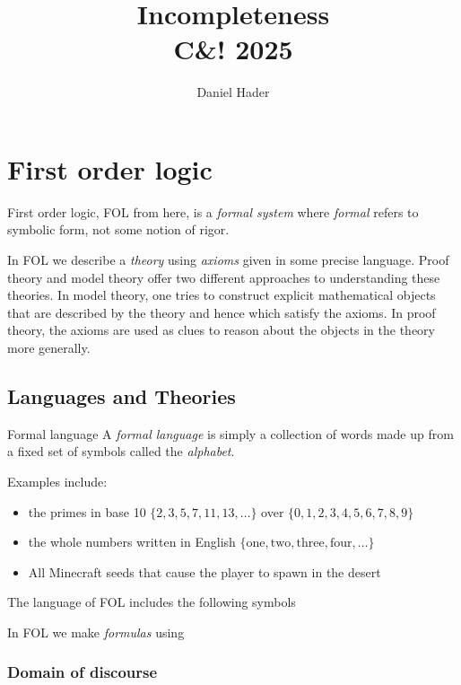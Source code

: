 \documentclass[12pt]{article}
\title{Incompleteness\\\large C\&! 2025}
\author{Daniel Hader}
\date{}
\begin{document}
	\maketitle
	
	\section{First order logic}
	
	
	First order logic, FOL from here, is a \emph{formal system} where \emph{formal} refers to symbolic form, not some notion of rigor.
	
	In FOL we describe a \emph{theory} using \emph{axioms} given in some precise language. Proof theory and model theory offer two different approaches to understanding these theories. In model theory, one tries to construct explicit mathematical objects that are described by the theory and hence which satisfy the axioms. In proof theory, the axioms are used as clues to reason about the objects in the theory more generally. 
	
	\subsection{Languages and Theories}
	
	\begin{definition}{Formal language}
		A \emph{formal language} is simply a collection of words made up from a fixed set of symbols called the \emph{alphabet}. 
	\end{definition}
	
	\noindent Examples include:
	\begin{itemize}[itemsep=0pt]
		\item the primes in base 10 $\{2, 3, 5, 7, 11, 13, \ldots \}$ over $\{0,1,2,3,4,5,6,7,8,9\}$
		\item the whole numbers written in English $\{\text{one},\text{two},\text{three},\text{four},\ldots\}$
		\item All Minecraft seeds that cause the player to spawn in the desert
	\end{itemize}
	
	\noindent The language of FOL includes the following symbols
	
	\noindent In FOL we make \emph{formulas} using 
	
	\subsubsection{Domain of discourse}
	
\end{document}
